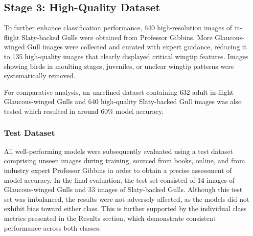 \documentclass[a4paper,12pt]{report}
\begin{document}
\subsection{Stage 3: High-Quality Dataset}

To further enhance classification performance, 640 high-resolution images of in-flight Slaty-backed Gulls were obtained from Professor Gibbins. More Glaucous-winged Gull images were collected and curated with expert guidance, reducing it to 135 high-quality images that clearly displayed critical wingtip features.  Images showing birds in moulting stages, juveniles, or unclear wingtip patterns were systematically removed.

For comparative analysis, an unrefined dataset containing 632 adult in-flight Glaucous-winged Gulls and 640 high-quality Slaty-backed Gull images was also tested which resulted in around 60\% model accuracy.

\subsubsection{Test Dataset}

All well-performing models were subsequently evaluated using a test dataset comprising unseen images during training, sourced from books, online, and from industry expert Professor Gibbins in order to obtain a precise assessment of model accuracy. In the final evaluation, the test set consisted of 14 images of Glaucous-winged Gulls and 33 images of Slaty-backed Gulls. Although this test set was imbalanced, the results were not adversely affected, as the models did not exhibit bias toward either class. This is further supported by the individual class metrics presented in the Results section, which demonstrate consistent performance across both classes.




\end{document}
